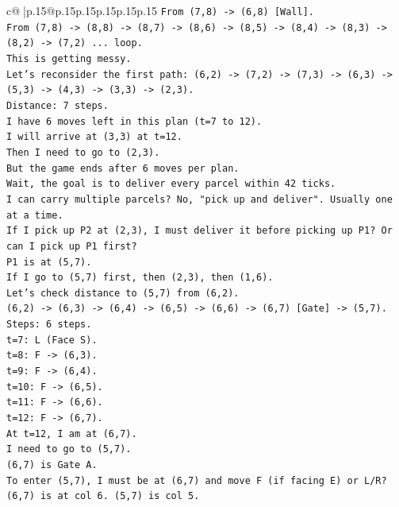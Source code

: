 \documentclass{article}
\begin{document}
{\begin{supertabular}{c@{$\;$}|p{.15\linewidth}@{}p{.15\linewidth}p{.15\linewidth}p{.15\linewidth}p{.15\linewidth}p{.15\linewidth}}
{{{\texttt{From (7,8) {-}> (6,8) {[}Wall{]}.} \\
\texttt{From (7,8) {-}> (8,8) {-}> (8,7) {-}> (8,6) {-}> (8,5) {-}> (8,4) {-}> (8,3) {-}> (8,2) {-}> (7,2) ... loop.} \\
\texttt{This is getting messy.} \\
\texttt{Let's reconsider the first path: (6,2) {-}> (7,2) {-}> (7,3) {-}> (6,3) {-}> (5,3) {-}> (4,3) {-}> (3,3) {-}> (2,3).} \\
\texttt{Distance: 7 steps.} \\
\texttt{I have 6 moves left in this plan (t=7 to 12).} \\
\texttt{I will arrive at (3,3) at t=12.} \\
\texttt{Then I need to go to (2,3).} \\
\texttt{But the game ends after 6 moves per plan.} \\
\texttt{Wait, the goal is to deliver every parcel within 42 ticks.} \\
\texttt{I can carry multiple parcels? No, "pick up and deliver". Usually one at a time.} \\
\texttt{If I pick up P2 at (2,3), I must deliver it before picking up P1? Or can I pick up P1 first?} \\
\texttt{P1 is at (5,7).} \\
\texttt{If I go to (5,7) first, then (2,3), then (1,6).} \\
\texttt{Let's check distance to (5,7) from (6,2).} \\
\texttt{(6,2) {-}> (6,3) {-}> (6,4) {-}> (6,5) {-}> (6,6) {-}> (6,7) {[}Gate{]} {-}> (5,7).} \\
\texttt{Steps: 6 steps.} \\
\texttt{t=7: L (Face S).} \\
\texttt{t=8: F {-}> (6,3).} \\
\texttt{t=9: F {-}> (6,4).} \\
\texttt{t=10: F {-}> (6,5).} \\
\texttt{t=11: F {-}> (6,6).} \\
\texttt{t=12: F {-}> (6,7).} \\
\texttt{At t=12, I am at (6,7).} \\
\texttt{I need to go to (5,7).} \\
\texttt{(6,7) is Gate A.} \\
\texttt{To enter (5,7), I must be at (6,7) and move F (if facing E) or L/R?} \\
\texttt{(6,7) is at col 6. (5,7) is col 5.} \\
}}}
\end{supertabular}}
\end{document}
